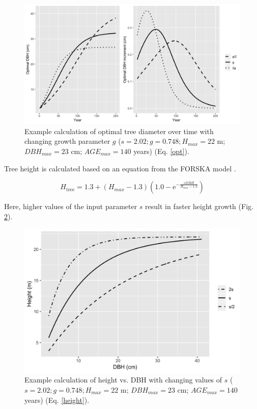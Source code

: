 \documentclass[a4paper, 12pt] {report}
\begin{document}
\begin{figure}
  \includegraphics[width=0.9\linewidth]{Figures/optDBH.png}
  \caption{Example calculation of optimal tree diameter over time with changing growth parameter $g$ ($s = 2.02; g = 0.748; H_{max} = 22$ m; $DBH_{max} = 23$ cm; $AGE_{max} = 140$ years) (Eq. \ref{opt}).}
  \label{fig:optDBH}
\end{figure}

Tree height is calculated based on an equation from the FORSKA model \cite{leemansFORSKAGeneralForest1989}.

\begin{equation} \label{height}
H_{\text{tree}} = 1.3 + (H_{max} - 1.3)(1.0 - \text{e}^{-\frac{sDBH}{H_{max} - 1.3}})
\end{equation}

Here, higher values of the input parameter $s$ result in faster  height growth (Fig. \ref{fig:height}).

\begin{figure}
  \includegraphics[width=0.9\linewidth]{Figures/height.png}
  \caption{Example calculation of height vs. DBH with changing values of $s$ ($s = 2.02; g = 0.748; H_{max} = 22$ m; $DBH_{max} = 23$ cm; $AGE_{max} = 140$ years) (Eq. \ref{height}).}
  \label{fig:height}
\end{figure}
\end{document}
